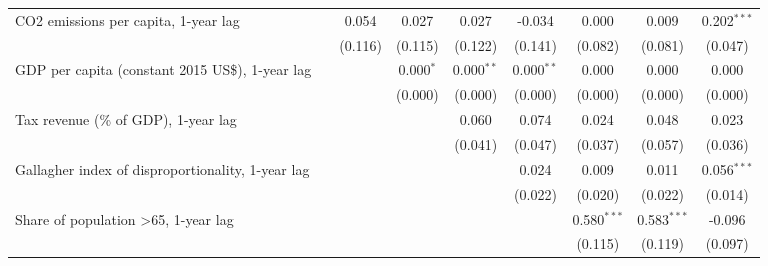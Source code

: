 \begin{table}[htbp]
\begin{tabular}{lcccccccc}
      CO2 emissions per capita, 1-year lag                                                                 &              & 0.054        & 0.027        & 0.027        & -0.034       & 0.000         & 0.009         & 0.202$^{***}$\\   
                                                                                                           &              & (0.116)      & (0.115)      & (0.122)      & (0.141)      & (0.082)       & (0.081)       & (0.047)\\   
      GDP per capita (constant 2015 US\$), 1-year lag                                                      &              &              & 0.000$^{*}$  & 0.000$^{**}$ & 0.000$^{**}$ & 0.000         & 0.000         & 0.000\\   
                                                                                                           &              &              & (0.000)      & (0.000)      & (0.000)      & (0.000)       & (0.000)       & (0.000)\\   
      Tax revenue (\% of GDP), 1-year lag                                                                  &              &              &              & 0.060        & 0.074        & 0.024         & 0.048         & 0.023\\   
                                                                                                           &              &              &              & (0.041)      & (0.047)      & (0.037)       & (0.057)       & (0.036)\\   
      Gallagher index of disproportionality, 1-year lag                                                    &              &              &              &              & 0.024        & 0.009         & 0.011         & 0.056$^{***}$\\   
                                                                                                           &              &              &              &              & (0.022)      & (0.020)       & (0.022)       & (0.014)\\   
      Share of population >65, 1-year lag                                                                  &              &              &              &              &              & 0.580$^{***}$ & 0.583$^{***}$ & -0.096\\   
                                                                                                           &              &              &              &              &              & (0.115)       & (0.119)       & (0.097)\\   

\end{tabular}
\end{table}
